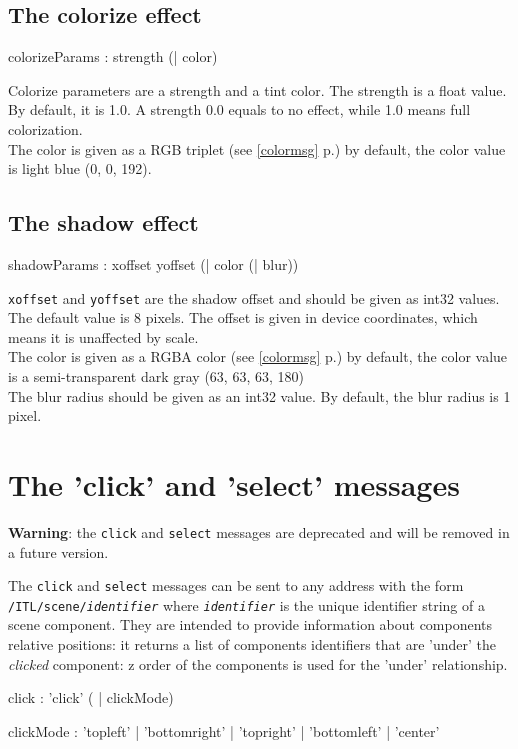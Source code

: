 \documentclass[a4paper,twoside]{report}
\newcommand{\sublevel}[1]	{\section{#1}}
\newcommand{\subsublevel}[1]	{\subsection{#1}}
\newcommand{\fullref}[1]	{\ref{#1} p.\pageref{#1}}
\newcommand{\OSC}[1]		{\texttt{#1}}
\begin{document}
\subsublevel{The colorize effect}

\begin{rail}
colorizeParams : strength (| color)
\end{rail}

Colorize parameters are a strength and a tint color. The strength is a float value. By default, it is 1.0. A strength 0.0 equals to no effect, while 1.0 means full colorization. \\
The color is given as a RGB triplet (see \fullref{colormsg}) by default, the color value is light blue (0, 0, 192).


\subsublevel{The shadow effect}

\begin{rail}
shadowParams : xoffset yoffset (| color (| blur))
\end{rail}

\OSC{xoffset} and \OSC{yoffset} are the shadow offset and should be given as int32 values. The default value is 8 pixels. The offset is given in device coordinates, which means it is unaffected by scale. \\
The color is given as a RGBA color (see \fullref{colormsg}) by default, the color value is a semi-transparent dark gray (63, 63, 63, 180) \\
The blur radius should be given as an int32 value. By default, the blur radius is 1 pixel.

\sublevel{The 'click' and 'select' messages}
\label{csmsg}

\textbf{Warning}: the \OSC{click} and \OSC{select} messages are deprecated and will be removed in a future version.

The \OSC{click} and \OSC{select} messages can be sent to any address with the form \OSC{/ITL/scene/\textit{identifier}} where \OSC{\textit{identifier}} is the unique identifier string of a scene component. They are intended to provide information about components relative positions: it returns a list of components identifiers that are 'under' the \emph{clicked} component: z order of the components is used for the 'under' relationship. 
 
\begin{rail}
click :		'click' ( | clickMode)
\end{rail}
 
\begin{rail}
clickMode :	'topleft' | 'bottomright' | 'topright' | 'bottomleft' | 'center'
\end{rail}
\end{document}
